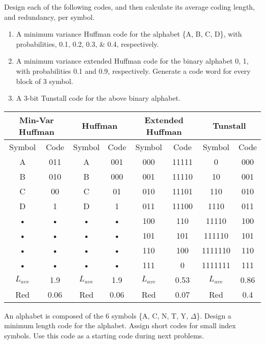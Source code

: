 \begin{question}
Design each of the following codes, and then calculate its average coding length, and
redundancy, per symbol.
\begin{enumerate}
\item A minimum variance Huffman code for the alphabet \{A, B, C, D\}, with probabilities, 0.1, 0.2, 0.3, \& 0.4, respectively.
\item A minimum variance extended Huffman code for the binary alphabet {0, 1}, with
probabilities 0.1 and 0.9, respectively. Generate a code word for every block of 3 symbol.
\item A 3-bit Tunstall code for the above binary alphabet.
\end{enumerate}
\end{question}
\begin{solution}

\begin{tabular}{||c|c||c|c||c|c||c|c||}
\hline 
\multicolumn{2}{||c||}{Min-Var Huffman} & \multicolumn{2}{||c||}{Huffman} & \multicolumn{2}{||c||}{Extended Huffman} & \multicolumn{2}{||c||}{Tunstall} \\ 
\hline 
Symbol & Code & Symbol & Code & Symbol & Code & Symbol & Code \\ 
\hline 
A & 011 & A & 001 & 000 & 11111 & 0 & 000 \\ 
\hline 
B & 010 & B & 000 & 001 & 11110 & 10 & 001 \\ 
\hline 
C & 00 & C & 01 & 010 & 11101 & 110 & 010 \\ 
\hline 
D & 1 & D & 1 & 011 & 11100 & 1110 & 011 \\ 
\hline 
• & • & • & • & 100 & 110 & 11110 & 100 \\ 
\hline 
• & • & • & • & 101 & 101 & 111110 & 101 \\ 
\hline 
• & • & • & • & 110 & 100 & 1111110 & 110 \\ 
\hline 
• & • & • & • & 111 & 0 & 1111111 & 111 \\ 
\hline 
$L_{ave}$ & 1.9  & $L_{ave}$ & 1.9  & $L_{ave}$ & 0.53 & $L_{ave}$ & 0.86  \\ 
\hline 
Red & 0.06 & Red & 0.06 & Red & 0.07 & Red & 0.4  \\ 
\hline 

\end{tabular} 

\end{solution}

\begin{question}
An alphabet is composed of the 6 symbols \{A, C, N, T, Y, $\Delta$\}. Design a minimum length code for the alphabet. Assign short codes for small index symbols. Use this code as a starting code during next problems.
\end{question}

